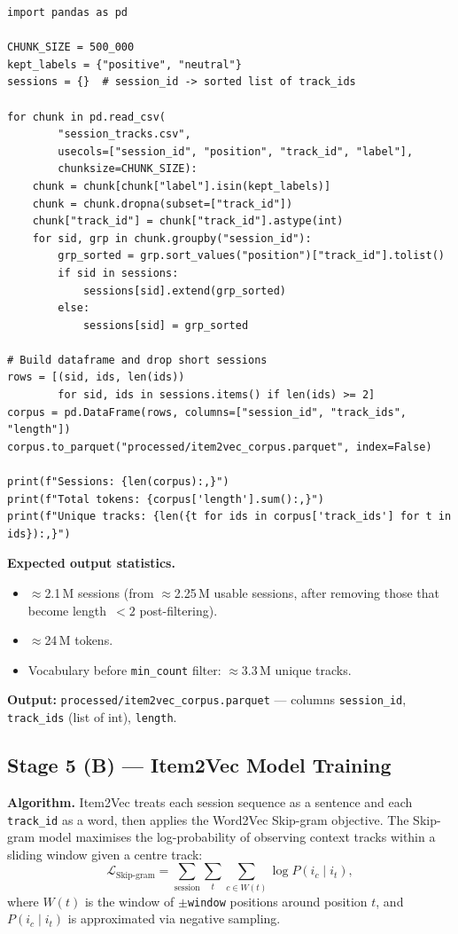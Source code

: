 \documentclass[11pt]{article}
\begin{document}
\begin{lstlisting}
import pandas as pd

CHUNK_SIZE = 500_000
kept_labels = {"positive", "neutral"}
sessions = {}  # session_id -> sorted list of track_ids

for chunk in pd.read_csv(
        "session_tracks.csv",
        usecols=["session_id", "position", "track_id", "label"],
        chunksize=CHUNK_SIZE):
    chunk = chunk[chunk["label"].isin(kept_labels)]
    chunk = chunk.dropna(subset=["track_id"])
    chunk["track_id"] = chunk["track_id"].astype(int)
    for sid, grp in chunk.groupby("session_id"):
        grp_sorted = grp.sort_values("position")["track_id"].tolist()
        if sid in sessions:
            sessions[sid].extend(grp_sorted)
        else:
            sessions[sid] = grp_sorted

# Build dataframe and drop short sessions
rows = [(sid, ids, len(ids))
        for sid, ids in sessions.items() if len(ids) >= 2]
corpus = pd.DataFrame(rows, columns=["session_id", "track_ids", "length"])
corpus.to_parquet("processed/item2vec_corpus.parquet", index=False)

print(f"Sessions: {len(corpus):,}")
print(f"Total tokens: {corpus['length'].sum():,}")
print(f"Unique tracks: {len({t for ids in corpus['track_ids'] for t in ids}):,}")
\end{lstlisting}

\textbf{Expected output statistics.}
\begin{itemize}
  \item $\approx$2.1\,M sessions (from $\approx$2.25\,M usable sessions,
        after removing those that become length~$< 2$ post-filtering).
  \item $\approx$24\,M tokens.
  \item Vocabulary before \texttt{min\_count} filter: $\approx$3.3\,M unique tracks.
\end{itemize}

\textbf{Output:} \texttt{processed/item2vec\_corpus.parquet} ---
columns \texttt{session\_id}, \texttt{track\_ids} (list of int), \texttt{length}.

\subsection{Stage 5 (B) --- Item2Vec Model Training}

\textbf{Algorithm.}
Item2Vec treats each session sequence as a sentence and each
\texttt{track\_id} as a word, then applies the Word2Vec Skip-gram
objective. The Skip-gram model maximises the log-probability of
observing context tracks within a sliding window given a centre track:
\[
  \mathcal{L}_{\text{Skip-gram}} = \sum_{\text{session}} \sum_{t}
    \sum_{c \in W(t)} \log P(i_c \mid i_t),
\]
where $W(t)$ is the window of $\pm$\texttt{window} positions around
position $t$, and $P(i_c \mid i_t)$ is approximated via negative sampling.
\end{document}
